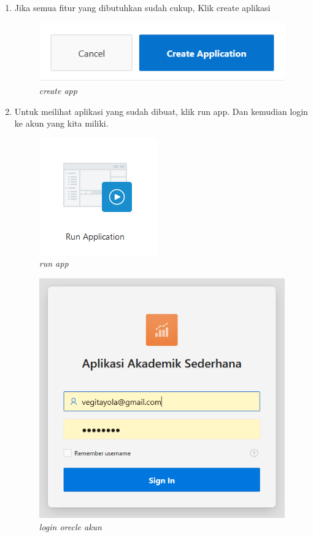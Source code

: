 \begin{enumerate}
    \newpage
    \item Jika semua fitur yang dibutuhkan sudah cukup, Klik create aplikasi
    
   \begin{figure}[!htbp]
       \centering
       \includegraphics[scale=0.7]{figure/create_app.PNG}
       \caption{\textit{create app}}
       \label{fig:my_label}
   \end{figure}
   
   \item Untuk meilihat aplikasi yang sudah dibuat, klik run app. Dan kemudian login ke akun yang kita miliki.
   
   \begin{figure}[!htbp]
       \centering
       \includegraphics[scale=0.7]{figure/run_app.PNG}
       \caption{\textit{run app}}
       \label{fig:my_label}
   \end{figure}
   
    \newpage
   \begin{figure}[!htbp]
       \centering
       \includegraphics[scale=0.4]{figure/login_akun_app.PNG}
       \caption{\textit{login orecle akun}}
       \label{fig:my_label}
   \end{figure}
   

\end{enumerate}
